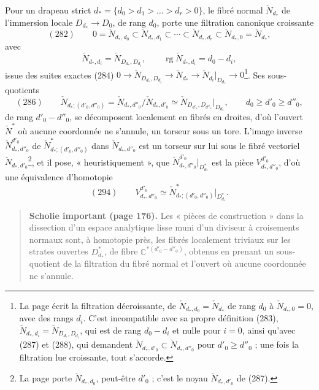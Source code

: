 \documentclass[11pt,a4paper]{article}
\begin{document}
Pour un drapeau strict $d_* = \{d_0 > d_1 > \dots > d_r > 0\}$, le fibré normal
$\check{N}_{d_*}$ de l'immersion locale $D_{d_*} \to D_0$, de rang $d_0$, porte
une filtration canonique croissante
\[
(282) \qquad 0 = \check{N}_{d_*, d_0} \subset \check{N}_{d_*, d_1} \subset \cdots
\subset \check{N}_{d_*, d_r} \subset \check{N}_{d_*, 0} = \check{N}_{d_*},
\]
avec
\[
\check{N}_{d_*, d_i} = \check{N}_{D_{d_*}, D_{d_i}}, \qquad
\operatorname{rg} \check{N}_{d_*, d_i} = d_0 - d_i,
\]
issue des suites exactes (284) $0 \to \check{N}_{D_{d_*}, D_{d_i}} \to
\check{N}_{d_*} \to \check{N}_{d_i}|_{D_{d_*}} \to 0$\footnote{La page écrit la
filtration décroissante, de $\check{N}_{d_*, d_0} = \check{N}_{d_*}$ de rang $d_0$
à $\check{N}_{d_*, 0} = 0$, avec des rangs $d_i$. C'est incompatible avec sa
propre définition (283), $\check{N}_{d_*, d_i} = \check{N}_{D_{d_*}, D_{d_i}}$,
qui est de rang $d_0 - d_i$ et nulle pour $i = 0$, ainsi qu'avec (287) et (288),
qui demandent $\check{N}_{d_*, d'_0} \subset \check{N}_{d_*, d''_0}$ pour $d'_0
\geq d''_0$ ; une fois la filtration lue croissante, tout s'accorde.}. Ses
sous-quotients
\[
(286) \qquad \check{N}_{d_*; (d'_0, d''_0)} = \check{N}_{d_*, d''_0} /
\check{N}_{d_*, d'_0} \simeq \check{N}_{D_{d'_*}, D_{d''_*}}|_{D_{d_*}},
\qquad d_0 \geq d'_0 \geq d''_0,
\]
de rang $d'_0 - d''_0$, se décomposent localement en fibrés en droites, d'où
l'ouvert $\check{N}^{*}$ où aucune coordonnée ne s'annule, un torseur sous un tore.
L'image inverse $\check{N}^{d'_0}_{d_*, d''_0}$ de $\check{N}^{*}_{d_*; (d'_0,
d''_0)}$ dans $\check{N}_{d_*, d''_0}$ est un torseur sur lui sous le fibré
vectoriel $\check{N}_{d_*, d'_0}$\footnote{La page porte $\check{N}_{d_*, d_0}$,
peut-être $d'_0$ ; c'est le noyau $\check{N}_{d_*, d'_0}$ de (287).}, et il pose,
« heuristiquement », que $\check{N}^{d'_0}_{d_*, d''_0}|_{D^{*}_{d_*}}$ est la
pièce $V^{d'_0}_{d_*, d''_0}$, d'où une équivalence d'homotopie
\[
(294) \qquad V^{d'_0}_{d_*, d''_0} \simeq \check{N}^{*}_{d_*; (d'_0,
d''_0)}\big|_{D^{*}_{d_*}} .
\]

\begin{quote}
\textbf{Scholie important (page 176).} Les « pièces de construction » dans la
dissection d'un espace analytique lisse muni d'un diviseur à croisements normaux
sont, à homotopie près, les fibrés localement triviaux sur les strates ouvertes
$D^{*}_{d_*}$, de fibre $\mathbb{C}^{*(d'_0 - d''_0)}$, obtenus en prenant un
sous-quotient de la filtration du fibré normal et l'ouvert où aucune coordonnée
ne s'annule.
\end{quote}
\end{document}
